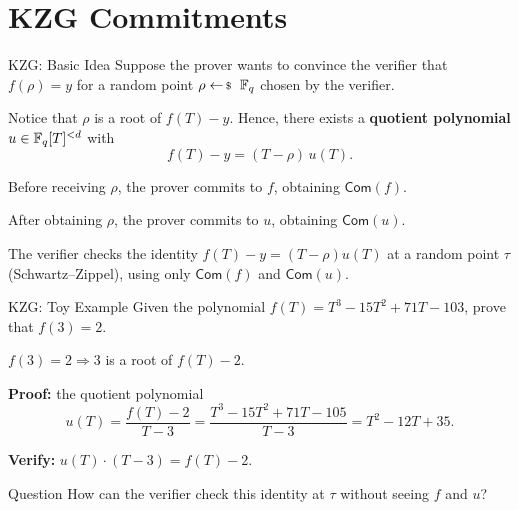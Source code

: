 \documentclass{zkdl-presentation-template}
\begin{document}
    \section{KZG Commitments}

    \begin{frame}{KZG: Basic Idea}
        Suppose the prover wants to convince the verifier that $f(\rho) = y$ for a random point $\rho \leftarrowS \F_q$ chosen by the verifier.
        \pause

        Notice that $\rho$ is a root of $f(T) - y$. Hence, there exists a \textbf{quotient polynomial} $u \in \mathbb{F}_q[T]^{<d}$ with
        \begin{equation*}
            f(T) - y = (T - \rho)\,u(T).
        \end{equation*}
        \pause

        \begin{algoen}
            \item Before receiving $\rho$, the prover commits to $f$, obtaining $\mathsf{Com}(f)$.\pause
            \item After obtaining $\rho$, the prover commits to $u$, obtaining $\mathsf{Com}(u)$.\pause
            \item The verifier checks the identity $f(T) - y = (T - \rho)u(T)$ at a random point $\tau$ (Schwartz--Zippel), using only $\mathsf{Com}(f)$ and $\mathsf{Com}(u)$.
        \end{algoen}
    \end{frame}

    \begin{frame}{KZG: Toy Example}
        Given the polynomial $f(T) = T^3 - 15T^2 + 71T - 103$, prove that $f(3) = 2$.
        \pause
        \vspace{0.3cm}

        $f(3) = 2 \Longrightarrow 3$ is a root of $f(T) - 2$.
        \pause
        \vspace{0.3cm}

        \textbf{Proof:} the quotient polynomial
        \begin{equation*}
            u(T) = \frac{f(T) - 2}{T - 3} = \frac{T^3 - 15T^2 + 71T - 105}{T - 3} = T^2 - 12T + 35.
        \end{equation*}
        \pause

        \textbf{Verify:} $u(T) \cdot (T - 3) = f(T) - 2$.
        \pause
        \vspace{0.3cm}

        \begin{questionblock}{Question}
            How can the verifier check this identity at $\tau$ without seeing $f$ and $u$?
        \end{questionblock}
    \end{frame}
\end{document}
